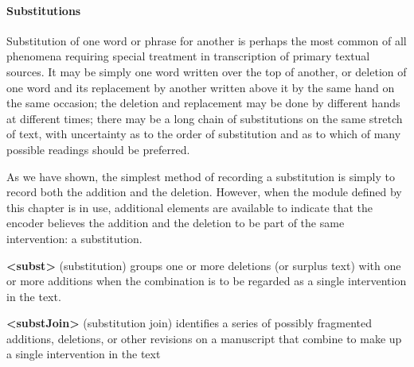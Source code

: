 \paragraph[{Substitutions}]{Substitutions}\label{PHSU}\par
Substitution of one word or phrase for another is perhaps the most common of all phenomena requiring special treatment in transcription of primary textual sources. It may be simply one word written over the top of another, or deletion of one word and its replacement by another written above it by the same hand on the same occasion; the deletion and replacement may be done by different hands at different times; there may be a long chain of substitutions on the same stretch of text, with uncertainty as to the order of substitution and as to which of many possible readings should be preferred.\par
As we have shown, the simplest method of recording a substitution is simply to record both the addition and the deletion. However, when the module defined by this chapter is in use, additional elements are available to indicate that the encoder believes the addition and the deletion to be part of the same intervention: a substitution. 
\begin{sansreflist}
  
\item [\textbf{<subst>}] (substitution) groups one or more deletions (or surplus text) with one or more additions when the combination is to be regarded as a single intervention in the text.
\item [\textbf{<substJoin>}] (substitution join) identifies a series of possibly fragmented additions, deletions, or other revisions on a manuscript that combine to make up a single intervention in the text
\end{sansreflist}
